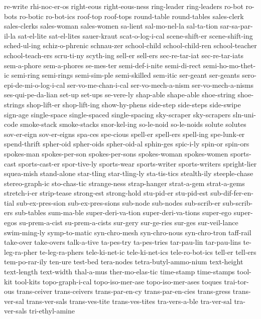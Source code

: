 {re-write
rhi-noc-er-os
right-eous
right-eous-ness
ring-leader
ring-leaders
ro-bot
ro-bots
ro-botic
ro-bot-ics
roof-top
roof-tops
round-table
round-tables
sales-clerk
sales-clerks
sales-woman
sales-women
sa-lient
sal-mo-nel-la
sal-ta-tion
sar-sa-par-il-la
sat-el-lite
sat-el-lites
sauer-kraut
scat-o-log-i-cal
scene-shift-er
scene-shift-ing
sched-ul-ing
schiz-o-phrenic
schnau-zer
school-child
school-child-ren
school-teacher
school-teach-ers
scru-ti-ny
scyth-ing
sell-er
sell-ers
sec-re-tar-iat
sec-re-tar-iats
sem-a-phore
sem-a-phores
se-mes-ter
semi-def-i-nite
semi-di-rect
semi-ho-mo-thet-ic
semi-ring
semi-rings
semi-sim-ple
semi-skilled
sem-itic
ser-geant
ser-geants
sero-epi-de-mi-o-log-i-cal
ser-vo-me-chan-i-cal
ser-vo-mech-a-nism
ser-vo-mech-a-nisms
ses-qui-pe-da-lian
set-up
set-ups
se-vere-ly
shap-able
shape-able
shoe-string
shoe-strings
shop-lift-er
shop-lift-ing
show-hy-phens
side-step
side-steps
side-swipe
sign-age
single-space
single-spaced
single-spacing
sky-scraper
sky-scrapers
sln-uni-code
smoke-stack
smoke-stacks
snor-kel-ing
so-le-noid
so-le-noids
solute
solutes
sov-er-eign
sov-er-eigns
spa-ces
spe-cious
spell-er
spell-ers
spell-ing
spe-lunk-er
spend-thrift
spher-oid
spher-oids
spher-oid-al
sphin-ges
spic-i-ly
spin-or
spin-ors
spokes-man
spokes-per-son
spokes-per-sons
spokes-woman
spokes-women
sports-cast
sports-cast-er
spor-tive-ly
sports-wear
sports-writer
sports-writers
spright-lier
squea-mish
stand-alone
star-tling
star-tling-ly
sta-tis-tics
stealth-ily
steeple-chase
stereo-graph-ic
sto-chas-tic
strange-ness
strap-hanger
strat-a-gem
strat-a-gems
stretch-i-er
strip-tease
strong-est
strong-hold
stu-pid-er
stu-pid-est
sub-dif-fer-en-tial
sub-ex-pres-sion
sub-ex-pres-sions
sub-node
sub-nodes
sub-scrib-er
sub-scrib-ers
sub-tables
sum-ma-ble
super-deri-va-tion
super-deri-va-tions
super-ego
super-egos
su-prem-a-cist
su-prem-a-cists
sur-gery
sur-ge-ries
sur-ges
sur-veil-lance
swim-ming-ly
symp-to-matic
syn-chro-mesh
syn-chro-nous
syn-chro-tron
taff-rail
take-over
take-overs
talk-a-tive
ta-pes-try
ta-pes-tries
tar-pau-lin
tar-pau-lins
te-leg-ra-pher
te-leg-ra-phers
tele-ki-net-ic
tele-ki-net-ics
tele-ro-bot-ics
tell-er
tell-ers
tem-po-rar-ily
ten-ure
test-bed
tera-nodes
tetra-butyl-ammo-nium
text-height
text-length
text-width
thal-a-mus
ther-mo-elas-tic
time-stamp
time-stamps
tool-kit
tool-kits
topo-graph-i-cal
topo-iso-mer-ase
topo-iso-mer-ases
toques
trai-tor-ous
trans-ceiver
trans-ceivers
trans-par-en-cy
trans-par-en-cies
trans-gress
trans-ver-sal
trans-ver-sals
trans-ves-tite
trans-ves-tites
tra-vers-a-ble
tra-ver-sal
tra-ver-sals
tri-ethyl-amine
}
